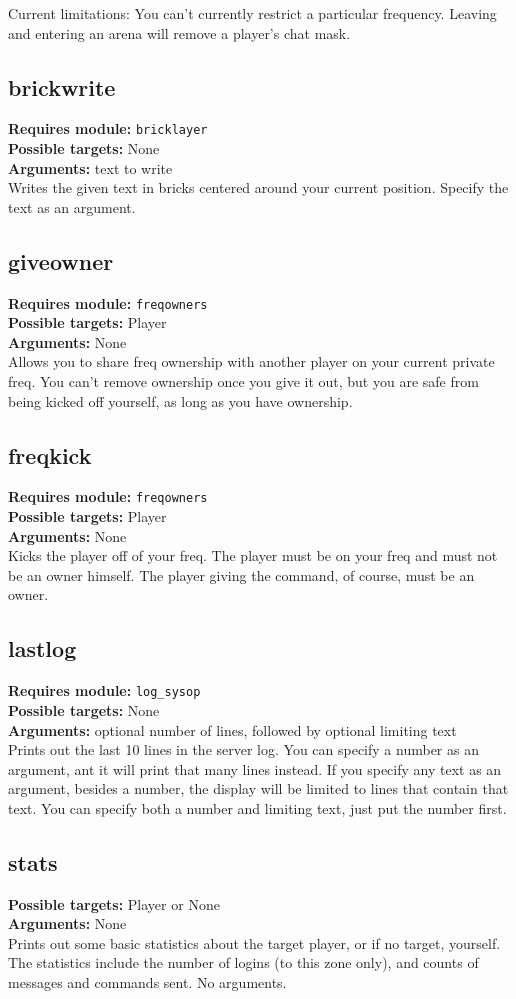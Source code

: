 \documentclass{article}
\newcommand{\requiremod}[1]{\noindent\textbf{Requires module:} \texttt{#1}\\}
\newcommand{\targets}[1]{\noindent\textbf{Possible targets:} #1\\}
\newcommand{\args}[1]{\noindent\textbf{Arguments:} #1\\}
\begin{document}
Current limitations: You can't currently restrict a particular
frequency. Leaving and entering an arena will remove a player's chat
mask.


\subsection{brickwrite}  %
\requiremod{bricklayer}
\targets{None}
\args{text to write}
Writes the given text in bricks centered around your current position.
Specify the text as an argument.

\subsection{giveowner}  %
\requiremod{freqowners}
\targets{Player}
\args{None}
Allows you to share freq ownership with another player on your current
private freq. You can't remove ownership once you give it out, but you
are safe from being kicked off yourself, as long as you have ownership.

\subsection{freqkick}  %
\requiremod{freqowners}
\targets{Player}
\args{None}
Kicks the player off of your freq. The player must be on your freq and
must not be an owner himself. The player giving the command, of course,
must be an owner.

\subsection{lastlog}  %
\requiremod{log\_sysop}
\targets{None}
\args{optional number of lines, followed by optional limiting text}
Prints out the last 10 lines in the server log. You can specify a number
as an argument, ant it will print that many lines instead. If you
specify any text as an argument, besides a number, the display will be
limited to lines that contain that text. You can specify both a number
and limiting text, just put the number first.

\subsection{stats}  %
\targets{Player or None}
\args{None}
Prints out some basic statistics about the target player, or if no
target, yourself. The statistics include the number of logins (to this
zone only), and counts of messages and commands sent. No arguments.
\end{document}
